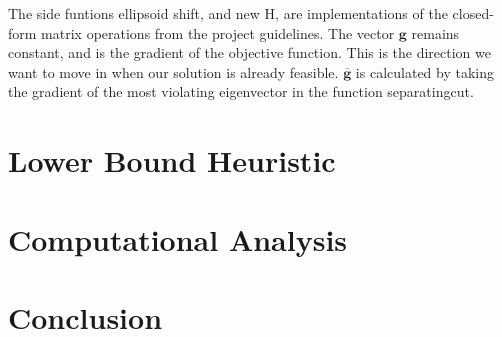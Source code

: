 \documentclass[12pt]{article}
\theoremstyle{plain}
\theoremstyle{definition}
\begin{document}
The side funtions ellipsoid shift, and new H, are implementations of the closed-form matrix operations from the project guidelines. The vector $\mathbf{g}$ remains constant, and is the gradient of the objective function. This is the direction we want to move in when our solution is already feasible. $\overline{\mathbf{g}}$ is calculated by taking the gradient of the most violating eigenvector in the function separatingcut.

\section{Lower Bound Heuristic}
\section{Computational Analysis}
\section{Conclusion}
\end{document}
